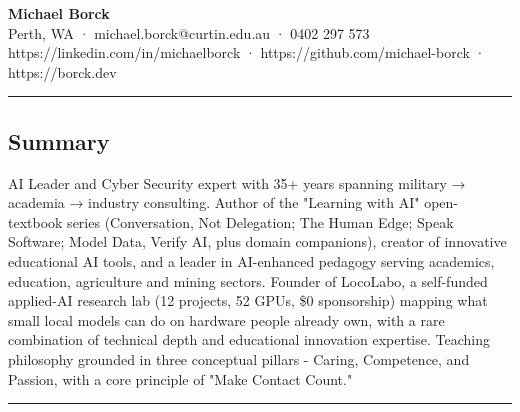 \documentclass[11pt,a4paper]{article}
\begin{document}
\begin{center}
{\LARGE \textbf{Michael Borck}}\\[4pt]
Perth, WA · michael.borck@curtin.edu.au · 0402 297 573\\
https://linkedin.com/in/michaelborck · https://github.com/michael-borck · https://borck.dev
\end{center}
\vspace{4pt}\hrule\vspace{4pt}
\subsection*{Summary}
AI Leader and Cyber Security expert with 35+ years spanning military → academia → industry consulting. Author of the "Learning with AI" open-textbook series (Conversation, Not Delegation; The Human Edge; Speak Software; Model Data, Verify AI, plus domain companions), creator of innovative educational AI tools, and a leader in AI-enhanced pedagogy serving academics, education, agriculture and mining sectors. Founder of LocoLabo, a self-funded applied-AI research lab (12 projects, 52 GPUs, \$0 sponsorship) mapping what small local models can do on hardware people already own, with a rare combination of technical depth and educational innovation expertise. Teaching philosophy grounded in three conceptual pillars - Caring, Competence, and Passion, with a core principle of "Make Contact Count."
\vspace{4pt}\hrule\vspace{4pt}
\end{document}
